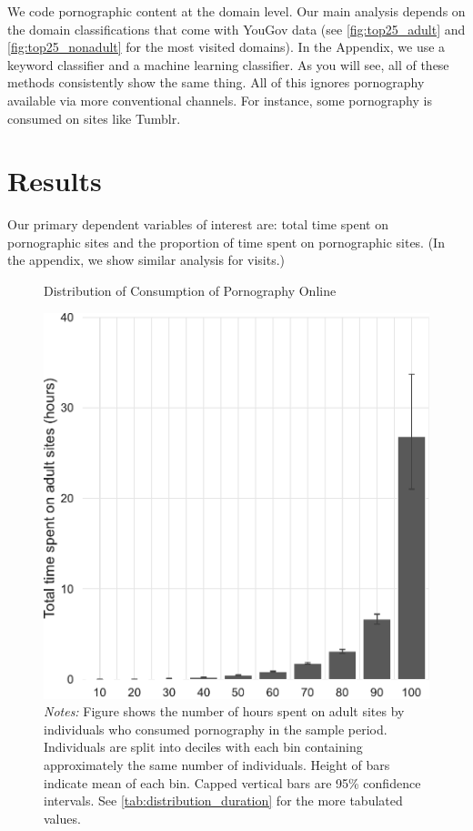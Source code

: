 \documentclass[12pt, letterpaper]{article}
\begin{document}
We code pornographic content at the domain level. Our main analysis depends on the domain classifications that come with YouGov data (see \cref{fig:top25_adult} and \cref{fig:top25_nonadult} for the most visited domains). In the Appendix, we use a keyword classifier and a machine learning classifier. As you will see, all of these methods consistently show the same thing. All of this ignores pornography available via more conventional channels. For instance, some pornography is consumed on sites like Tumblr.

\FloatBarrier
\section*{Results}

Our primary dependent variables of interest are: total time spent on pornographic sites and the proportion of time spent on pornographic sites. (In the appendix, we show similar analysis for visits.) 


\begin{figure}[ht]
\centering
\caption{Distribution of Consumption of Pornography Online}
\includegraphics[width=.5\linewidth]{../figs/distribution_duration_on_adultsites.pdf}
\caption*{\footnotesize \emph{Notes:} 
	Figure shows the number of hours spent on adult sites by individuals who consumed pornography in the sample period.
	Individuals are split into deciles with each bin containing approximately the same number of individuals.
	Height of bars indicate mean of each bin.
	Capped vertical bars are 95\% confidence intervals.
	See \cref{tab:distribution_duration} for the more tabulated values.
}
\label{fig:distribution_duration}
\end{figure}
\end{document}
